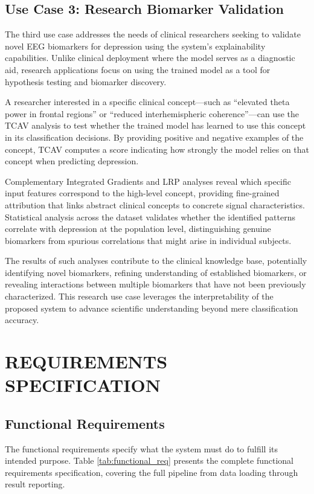 \subsection{Use Case 3: Research Biomarker Validation}

The third use case addresses the needs of clinical researchers seeking to validate novel EEG biomarkers for depression using the system's explainability capabilities. Unlike clinical deployment where the model serves as a diagnostic aid, research applications focus on using the trained model as a tool for hypothesis testing and biomarker discovery.

A researcher interested in a specific clinical concept---such as ``elevated theta power in frontal regions'' or ``reduced interhemispheric coherence''---can use the TCAV analysis to test whether the trained model has learned to use this concept in its classification decisions. By providing positive and negative examples of the concept, TCAV computes a score indicating how strongly the model relies on that concept when predicting depression.

Complementary Integrated Gradients and LRP analyses reveal which specific input features correspond to the high-level concept, providing fine-grained attribution that links abstract clinical concepts to concrete signal characteristics. Statistical analysis across the dataset validates whether the identified patterns correlate with depression at the population level, distinguishing genuine biomarkers from spurious correlations that might arise in individual subjects.

The results of such analyses contribute to the clinical knowledge base, potentially identifying novel biomarkers, refining understanding of established biomarkers, or revealing interactions between multiple biomarkers that have not been previously characterized. This research use case leverages the interpretability of the proposed system to advance scientific understanding beyond mere classification accuracy.

\section{REQUIREMENTS SPECIFICATION}

\subsection{Functional Requirements}

The functional requirements specify what the system must do to fulfill its intended purpose. Table \ref{tab:functional_req} presents the complete functional requirements specification, covering the full pipeline from data loading through result reporting.

